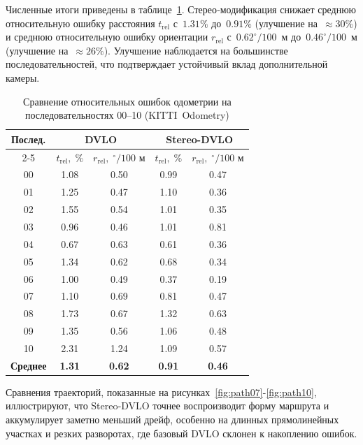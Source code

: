 Численные итоги приведены в таблице~\ref{tab:kitti_mono_vs_stereo}.
Стерео‑модификация снижает среднюю относительную ошибку
расстояния $t_{\mathrm{rel}}$ с $1.31\%$ до $0.91\%$
(улучшение на~$\approx30\%$) и
среднюю относительную ошибку ориентации $r_{\mathrm{rel}}$
с $0.62^{\circ}/100$ м до $0.46^{\circ}/100$ м
(улучшение на~$\approx26\%$).
Улучшение наблюдается на большинстве последовательностей,
что подтверждает устойчивый вклад дополнительной камеры.

\begin{table}
  \caption{Сравнение относительных ошибок одометрии
          на последовательностях 00–10
           (KITTI Odometry)}
    \label{tab:kitti_mono_vs_stereo}
  \begin{center}
    \begin{tabular}{|c|cc|cc|}
      \hline
      \multirow{2}{*}{Послед.} &
      \multicolumn{2}{c|}{DVLO} &
      \multicolumn{2}{c|}{Stereo-DVLO} \\
      \cline{2-5}
      & $t_{\mathrm{rel}},\;\%$ & $r_{\mathrm{rel}},\;^{\circ}/100\text{ м}$ &
        $t_{\mathrm{rel}},\;\%$ & $r_{\mathrm{rel}},\;^{\circ}/100\text{ м}$ \\ \hline
      00 & 1.08 & 0.50 & 0.99 & 0.47 \\
      01 & 1.25 & 0.47 & 1.10 & 0.36 \\
      02 & 1.55 & 0.54 & 1.01 & 0.35 \\
      03 & 0.96 & 0.46 & 1.01 & 0.81 \\
      04 & 0.67 & 0.63 & 0.61 & 0.36 \\
      05 & 1.34 & 0.62 & 0.68 & 0.34 \\
      06 & 1.00 & 0.49 & 0.37 & 0.19 \\
      07 & 1.10 & 0.69 & 0.81 & 0.47 \\
      08 & 1.73 & 0.67 & 1.32 & 0.63 \\
      09 & 1.35 & 0.56 & 1.06 & 0.48 \\
      10 & 2.31 & 1.24 & 1.09 & 0.57 \\ \hline
      \textbf{Среднее} & \textbf{1.31} & \textbf{0.62} &
      \textbf{0.91} & \textbf{0.46} \\ \hline
  \end{tabular}
  
  
  \end{center}
\end{table}

Сравнения траекторий, показанные на рисунках~\ref{fig:path07}-\ref{fig:path10},
иллюстрируют, что Stereo‑DVLO точнее воспроизводит форму маршрута
и аккумулирует заметно меньший дрейф, особенно на длинных
прямолинейных участках и резких разворотах, где базовый DVLO
склонен к накоплению ошибок.

